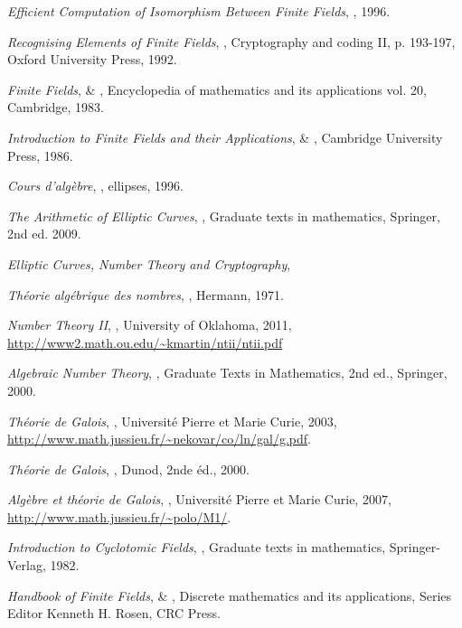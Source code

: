\documentclass[a4paper]{article} %
\numberwithin{section}{part}
\numberwithin{equation}{section}
\begin{document}
\begin{thebibliography}{LC}

 \emph{Efficient Computation of Isomorphism Between Finite Fields},
, 1996.

 \emph{Recognising Elements of Finite Fields}, , Cryptography and coding II, p. 193-197, Oxford University Press, 1992.

 \emph{Finite Fields},  \& 
, Encyclopedia of mathematics and its applications vol.
20, Cambridge, 1983.

 \emph{Introduction to Finite Fields and their Applications},
 \& , Cambridge University Press,
1986.

 \emph{Cours d'algèbre}, , ellipses, 1996.

 \emph{The Arithmetic of Elliptic Curves}, 
, Graduate texts in mathematics, Springer, 2nd ed. 
2009.

 \emph{Elliptic Curves, Number Theory and Cryptography},

 \emph{Théorie algébrique des nombres}, , 
Hermann, 1971.

 \emph{Number Theory II}, , University of
Oklahoma, 2011,  \url{http://www2.math.ou.edu/~kmartin/ntii/ntii.pdf}

 \emph{Algebraic Number Theory}, , Graduate Texts
in Mathematics, 2nd ed., Springer, 2000.

 \emph{Théorie de Galois}, , Université 
Pierre et Marie Curie, 2003,  
\url{http://www.math.jussieu.fr/~nekovar/co/ln/gal/g.pdf}.

 \emph{Théorie de Galois}, , Dunod, 2nde
éd., 2000.

 \emph{Algèbre et théorie de Galois}, , 
Université Pierre et Marie Curie, 2007,  
\url{http://www.math.jussieu.fr/~polo/M1/}.

 \emph{Introduction to Cyclotomic Fields}, , Graduate texts in mathematics, Springer-Verlag, 1982.

 \emph{Handbook of Finite Fields},  \& 
, Discrete mathematics and its applications, Series Editor 
Kenneth H. Rosen, CRC Press.


\end{thebibliography}
\end{document}
